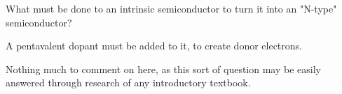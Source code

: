 

What must be done to an intrinsic semiconductor to turn it into an "N-type" semiconductor?







A pentavalent dopant must be added to it, to create donor electrons.







Nothing much to comment on here, as this sort of question may be easily answered through research of any introductory textbook.




